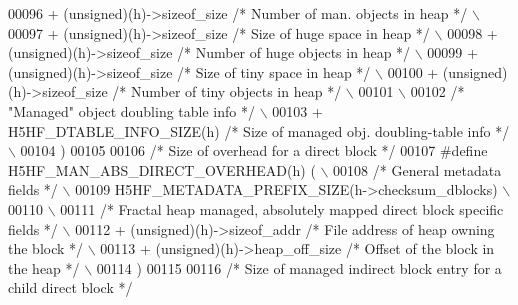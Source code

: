 \begin{DoxyCode}
00096 \textcolor{preprocessor}{    + (unsigned)(h)->sizeof\_size }\textcolor{comment}{/* Number of man. objects in heap */}\textcolor{preprocessor}{         \(\backslash\)}
00097 \textcolor{preprocessor}{    + (unsigned)(h)->sizeof\_size }\textcolor{comment}{/* Size of huge space in heap */}\textcolor{preprocessor}{             \(\backslash\)}
00098 \textcolor{preprocessor}{    + (unsigned)(h)->sizeof\_size }\textcolor{comment}{/* Number of huge objects in heap */}\textcolor{preprocessor}{         \(\backslash\)}
00099 \textcolor{preprocessor}{    + (unsigned)(h)->sizeof\_size }\textcolor{comment}{/* Size of tiny space in heap */}\textcolor{preprocessor}{             \(\backslash\)}
00100 \textcolor{preprocessor}{    + (unsigned)(h)->sizeof\_size }\textcolor{comment}{/* Number of tiny objects in heap */}\textcolor{preprocessor}{         \(\backslash\)}
00101 \textcolor{preprocessor}{                                                                              \(\backslash\)}
00102 \textcolor{preprocessor}{    }\textcolor{comment}{/* "Managed" object doubling table info */}\textcolor{preprocessor}{                                \(\backslash\)}
00103 \textcolor{preprocessor}{    + H5HF\_DTABLE\_INFO\_SIZE(h) }\textcolor{comment}{/* Size of managed obj. doubling-table info */}\textcolor{preprocessor}{ \(\backslash\)}
00104 \textcolor{preprocessor}{    )}
00105 
00106 \textcolor{comment}{/* Size of overhead for a direct block */}
00107 \textcolor{preprocessor}{#define H5HF\_MAN\_ABS\_DIRECT\_OVERHEAD(h) (                                     \(\backslash\)}
00108 \textcolor{preprocessor}{    }\textcolor{comment}{/* General metadata fields */}\textcolor{preprocessor}{                                             \(\backslash\)}
00109 \textcolor{preprocessor}{    H5HF\_METADATA\_PREFIX\_SIZE(h->checksum\_dblocks)                            \(\backslash\)}
00110 \textcolor{preprocessor}{                                                                              \(\backslash\)}
00111 \textcolor{preprocessor}{    }\textcolor{comment}{/* Fractal heap managed, absolutely mapped direct block specific fields */}\textcolor{preprocessor}{ \(\backslash\)}
00112 \textcolor{preprocessor}{    + (unsigned)(h)->sizeof\_addr          }\textcolor{comment}{/* File address of heap owning the block */}\textcolor{preprocessor}{ \(\backslash\)}
00113 \textcolor{preprocessor}{    + (unsigned)(h)->heap\_off\_size        }\textcolor{comment}{/* Offset of the block in the heap */}\textcolor{preprocessor}{ \(\backslash\)}
00114 \textcolor{preprocessor}{    )}
00115 
00116 \textcolor{comment}{/* Size of managed indirect block entry for a child direct block */}

\end{DoxyCode}
